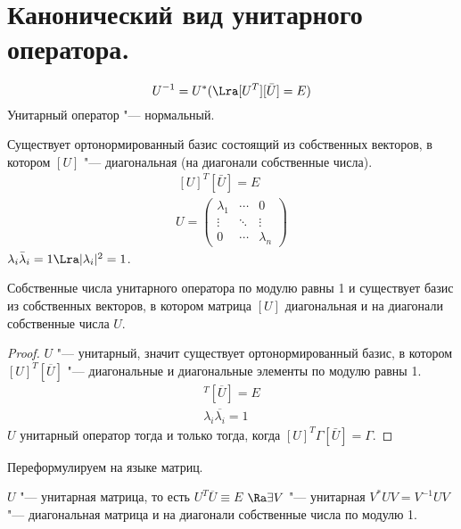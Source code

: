 ﻿\section{Канонический вид унитарного оператора.}

\[ U^{-1} = U^* (\Lra [U^T][\bar U] = E) \]
Унитарный оператор "--- нормальный.

Существует ортонормированный базис состоящий из собственных векторов, в котором $[U]$ "--- диагональная (на диагонали собственные числа).
\begin{gather*}
	\,[U]^T[\bar U] = E \\
	U = \begin{pmatrix}
		\lambda_1 & \cdots & 0 \\
		\vdots & \ddots & \vdots \\
		0 & \cdots & \lambda_n
	\end{pmatrix}
\end{gather*}
$\lambda_i \bar \lambda_i = 1 \Lra |\lambda_i|^2 = 1$.

\begin{theorem}
	Собственные числа унитарного оператора по модулю равны 1 и
	существует базис из собственных векторов, в котором матрица $[U]$ диагональная и
	на диагонали собственные числа $U$.
\end{theorem}

\begin{proof}
	$U$ "--- унитарный, значит существует ортонормированный базис, в котором $[U]^T[\overline{U}]$ "--- диагональные и диагональные элементы
	по модулю равны 1.
	\begin{gather*}
		[U]^T[\overline{U}] = E \\
		\lambda_i \overline{\lambda_i} = 1
	\end{gather*}
	$U$ унитарный оператор тогда и только тогда, когда $[U]^T\Gamma[\bar U] = \Gamma$.
\end{proof}

Переформулируем на языке матриц.

$U$ "--- унитарная матрица, то есть $U^T\overline{U} \equiv E$
$\Ra \exists V$ "--- унитарная $V^*UV = V^{-1}UV$ "--- диагональная матрица и на диагонали собственные числа по модулю 1.
